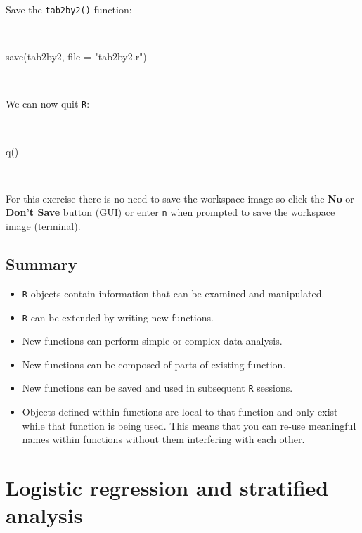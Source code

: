 \documentclass[
  12pt,
  a4paper]{book}
\newenvironment{Shaded}{\begin{snugshade}}{\end{snugshade}}
\newcommand{\AttributeTok}[1]{\textcolor[rgb]{0.77,0.63,0.00}{#1}}
\newcommand{\FunctionTok}[1]{\textcolor[rgb]{0.00,0.00,0.00}{#1}}
\newcommand{\NormalTok}[1]{#1}
\newcommand{\StringTok}[1]{\textcolor[rgb]{0.31,0.60,0.02}{#1}}
\begin{document}
Save the \texttt{tab2by2()} function:

~

\begin{Shaded}
\begin{Highlighting}[]
\FunctionTok{save}\NormalTok{(tab2by2, }\AttributeTok{file =} \StringTok{"tab2by2.r"}\NormalTok{)}
\end{Highlighting}
\end{Shaded}

~

We can now quit \texttt{R}:

~

\begin{Shaded}
\begin{Highlighting}[]
\FunctionTok{q}\NormalTok{()}
\end{Highlighting}
\end{Shaded}

~

For this exercise there is no need to save the workspace image so click the \textbf{No} or \textbf{Don't Save} button (GUI) or enter \texttt{n} when prompted to save the workspace image (terminal).

\hypertarget{summary-1}{%
\section{Summary}\label{summary-1}}

\begin{itemize}
\item
  \texttt{R} objects contain information that can be examined and manipulated.
\item
  \texttt{R} can be extended by writing new functions.
\item
  New functions can perform simple or complex data analysis.
\item
  New functions can be composed of parts of existing function.
\item
  New functions can be saved and used in subsequent \texttt{R} sessions.
\item
  Objects defined within functions are local to that function and only exist while that function is being used. This means that you can re-use meaningful names within functions without them interfering with each other.
\end{itemize}

\hypertarget{exercise3}{%
\chapter{Logistic regression and stratified analysis}\label{exercise3}}
\end{document}
